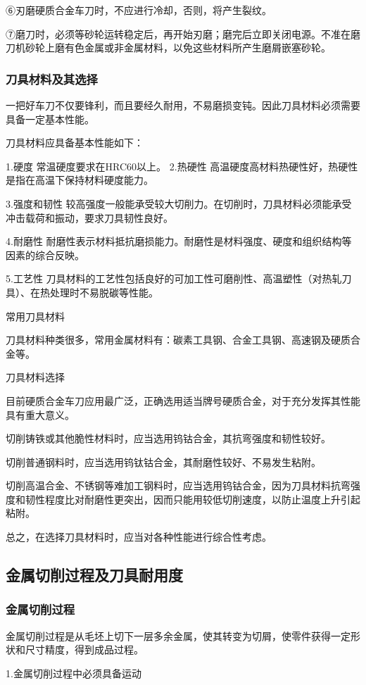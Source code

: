 \documentclass{ctexbook}
\begin{document}
⑥刃磨硬质合金车刀时，不应进行冷却，否则，将产生裂纹。

⑦磨刀时，必须等砂轮运转稳定后，再开始刃磨；磨完后立即关闭电源。不准在磨刀机砂轮上磨有色金属或非金属材料，以免这些材料所产生磨屑嵌塞砂轮。
\subsubsection{刀具材料及其选择}
一把好车刀不仅要锋利，而且要经久耐用，不易磨损变钝。因此刀具材料必须需要具备一定基本性能。

刀具材料应具备基本性能如下：

1.硬度 常温硬度要求在HRC60以上。
2.热硬性 高温硬度高材料热硬性好，热硬性是指在高温下保持材料硬度能力。

3.强度和韧性 较高强度一般能承受较大切削力。在切削时，刀具材料必须能承受冲击载荷和振动，要求刀具韧性良好。

4.耐磨性 耐磨性表示材料抵抗磨损能力。耐磨性是材料强度、硬度和组织结构等因素的综合反映。

5.工艺性 刀具材料的工艺性包括良好的可加工性可磨削性、高温塑性（对热轧刀具）、在热处理时不易脱碳等性能。

常用刀具材料

刀具材料种类很多，常用金属材料有：碳素工具钢、合金工具钢、高速钢及硬质合金等。

刀具材料选择

目前硬质合金车刀应用最广泛，正确选用适当牌号硬质合金，对于充分发挥其性能具有重大意义。

切削铸铁或其他脆性材料时，应当选用钨钴合金，其抗弯强度和韧性较好。

切削普通钢料时，应当选用钨钛钴合金，其耐磨性较好、不易发生粘附。

切削高温合金、不锈钢等难加工钢料时，应当选用钨钴合金，因为刀具材料抗弯强度和韧性程度比对耐磨性更突出，因而只能用较低切削速度，以防止温度上升引起粘附。

总之，在选择刀具材料时，应当对各种性能进行综合性考虑。
\subsection{金属切削过程及刀具耐用度}
\subsubsection{金属切削过程}
金属切削过程是从毛坯上切下一层多余金属，使其转变为切屑，使零件获得一定形状和尺寸精度，得到成品过程。

1.金属切削过程中必须具备运动
\end{document}
